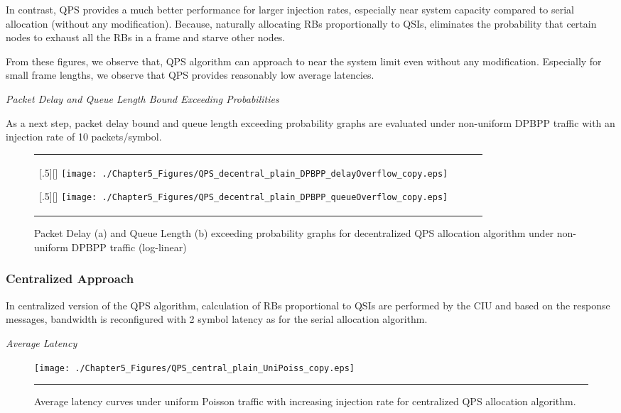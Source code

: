 In contrast, QPS provides a much better performance for larger injection rates, especially near system capacity compared to serial allocation (without any modification). Because, naturally allocating RBs proportionally to QSIs, eliminates the probability that certain nodes to exhaust all the RBs in a frame and starve other nodes. 

From these figures, we observe that, QPS algorithm can approach to near the system limit even without any modification. Especially for small frame lengths, we observe that QPS provides reasonably low average latencies.

\textit{Packet Delay and Queue Length Bound Exceeding Probabilities}


As a next step, packet delay bound and queue length exceeding probability graphs are evaluated under non-uniform DPBPP traffic with an injection rate of 10 packets/symbol.

 
\begin{figure*}[htbp]
  \centering
  \begin{tabular}[c]{cccc}

  \subcaptionbox{}[.5\linewidth][]{%
    \texttt{[image: ./Chapter5\_Figures/QPS\_decentral\_plain\_DPBPP\_delayOverflow\_copy.eps]} }	
    
  \subcaptionbox{}[.5\linewidth][]{%
    \texttt{[image: ./Chapter5\_Figures/QPS\_decentral\_plain\_DPBPP\_queueOverflow\_copy.eps]}}
 
   \end{tabular}

  \caption{Packet Delay (a) and Queue Length (b) exceeding probability graphs for decentralized QPS allocation algorithm under non-uniform DPBPP traffic (log-linear)}
\end{figure*}

\subsubsection{Centralized Approach}

In centralized version of the QPS algorithm, calculation of RBs proportional to QSIs are performed by the CIU and based on the response messages, bandwidth is reconfigured with 2 symbol latency as for the serial allocation algorithm. 

\textit{Average Latency}


\begin{figure}[htbp]
  \centering
    \texttt{[image: ./Chapter5\_Figures/QPS\_central\_plain\_UniPoiss\_copy.eps]}
    \rule{35em}{0.5pt}
  \caption[Centralized QPS Allocation Average latency under uniform Poisson]{Average latency curves under uniform Poisson traffic with increasing injection rate for centralized QPS allocation algorithm.}
  \label{fig:Electron}
\end{figure}

